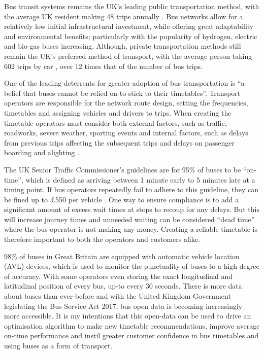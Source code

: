 \documentclass{article}
\begin{document}
Bus transit systems remains the UK's leading public transportation method, with the average UK resident making 48 trips annually \cite{RN9}. Bus networks allow for a relatively low initial infrastructural investment, while offering great adaptability and environmental benefits; particularly with the popularity of hydrogen, electric and bio-gas buses increasing. Although, private transportation methods still remain the UK's preferred method of transport, with the average person taking 602 trips by car \cite{RN9}, over 12 times that of the number of bus trips. 

\par
One of the leading deterrents for greater adoption of bus transportation is ``a belief that buses cannot be relied on to stick to their timetables''\cite{RN10}. Transport operators are responsible for the network route design, setting the frequencies, timetables and assigning vehicles and drivers to trips. When creating the timetable operators must consider both external factors, such as traffic, roadworks, severe weather, sporting events and internal factors, such as delays from previous trips affecting the subsequent trips and delays on passenger boarding and alighting \cite{RN11}.

\par
The UK Senior Traffic Commissioner’s guidelines are for 95\% of buses to be “on-time”, which is defined as arriving between 1 minute early to 5 minutes late at a timing point\cite{RN14}. If bus operators repeatedly fail to adhere to this guideline, they can be fined up to £550 per vehicle \cite{RN14}. One way to ensure compliance is to add a significant amount of excess wait times at stops to recoup for any delays. But this will increase journey times and unneeded waiting can be considered “dead time” where the bus operator is not making any money. Creating a reliable timetable is therefore important to both the operators and customers alike.


\par
98\% of buses in Great Britain are equipped with automatic vehicle location (AVL) devices\cite{RN12}, which is used to monitor the punctuality of buses to a high degree of accuracy. With some operators even storing the exact longitudinal and latitudinal position of every bus, up-to every 30 seconds. There is more data about buses than ever-before and with the United Kingdom Government legislating the Bus Service Act 2017\cite{RN13}, bus open data is becoming increasingly more accessible. It is my intentions that this open-data can be used to drive an optimisation algorithm to make new timetable recommendations, improve average on-time performance and instil greater customer confidence in bus timetables and using buses as a form of transport.
\end{document}
